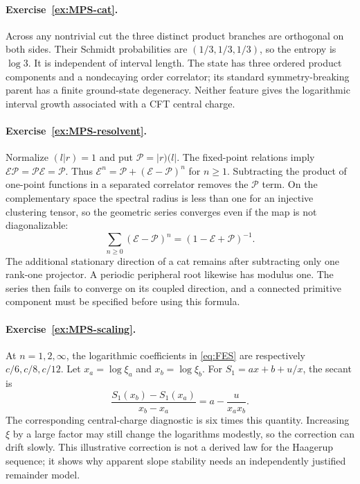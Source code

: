 \paragraph{Exercise~\ref{ex:MPS-cat}.}
\label{sol:ex:MPS-cat}
Across any nontrivial cut the three distinct product branches
are orthogonal on both sides. Their Schmidt probabilities are
$(1/3,1/3,1/3)$, so the entropy is $\log3$. It is independent
of interval length. The state has three ordered product components
and a nondecaying order correlator; its standard symmetry-breaking
parent has a finite ground-state degeneracy. Neither
feature gives the logarithmic interval growth associated with
a CFT central charge.



\paragraph{Exercise~\ref{ex:MPS-resolvent}.}
\label{sol:ex:MPS-resolvent}
Normalize $(l|r)=1$ and put $\mathcal P=|r)(l|$. The fixed-point
relations imply $\mathcal E\mathcal P=\mathcal P\mathcal E=
\mathcal P$. Thus
$\mathcal E^n=\mathcal P+(\mathcal E-\mathcal P)^n$ for
$n\geq1$. Subtracting the product of one-point functions in
a separated correlator removes the $\mathcal P$ term.
On the complementary space the spectral radius is less than
one for an injective clustering tensor, so the geometric
series converges even if the map is not diagonalizable:
\[
 \sum_{n\geq0}(\mathcal E-\mathcal P)^n
 =(1-\mathcal E+\mathcal P)^{-1}.
\]
The additional stationary direction of a cat remains after
subtracting only one rank-one projector. A periodic peripheral
root likewise has modulus one. The series then fails to
converge on its coupled direction, and a connected primitive
component must be specified before using this formula.



\paragraph{Exercise~\ref{ex:MPS-scaling}.}
\label{sol:ex:MPS-scaling}
At $n=1,2,\infty$, the logarithmic coefficients in
\eqref{eq:FES} are respectively $c/6,c/8,c/12$.
Let $x_a=\log\xi_a$ and $x_b=\log\xi_b$. For
$S_1=ax+b+u/x$, the secant is
\[
 \frac{S_1(x_b)-S_1(x_a)}{x_b-x_a}
 =a-\frac{u}{x_ax_b}.
\]
The corresponding central-charge diagnostic is six times this
quantity. Increasing $\xi$ by a large factor may still change
the logarithms modestly, so the correction can drift slowly.
This illustrative correction is not a derived law for the
Haagerup sequence; it shows why apparent slope stability needs
an independently justified remainder model.


